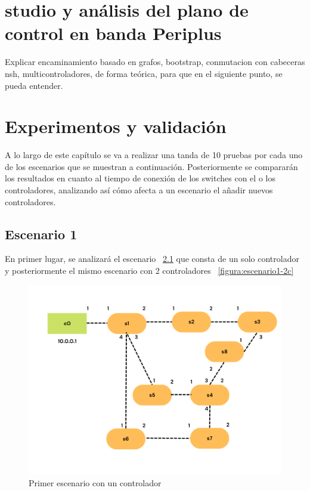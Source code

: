 \documentclass[a4paper, 12pt]{book}
\begin{document}
	\chapter{studio y análisis del plano de control en banda Periplus} %
	\label{chap:periplus} %
	Explicar encaminamiento basado en grafos, bootstrap, conmutacion con cabeceras nsh, multicontroladores, de forma teórica, para que en el siguiente punto, se pueda entender.
	
	
	\cleardoublepage
	\chapter{Experimentos y validación}
	\label{chap:experimentos}
	
 	A lo largo de este capítulo se va a realizar una tanda de 10 pruebas por cada uno de los escenarios que se muestran a continuación. Posteriormente se compararán los resultados en cuanto al tiempo de conexión de los switches con el o los controladores, analizando así cómo afecta a un escenario el añadir nuevos controladores.
 	
 	\section{Escenario 1}
 	En primer lugar, se analizará el escenario ~\ref{figura:escenario1-1c} que consta de un solo controlador y posteriormente el mismo escenario con 2 controladores ~\ref{figura:escenario1-2c}
 	
 	\begin{figure}[H]
 		\centering
 		\includegraphics[width=16cm, keepaspectratio]{img/escenario1-1}
 		\caption{Primer escenario con un controlador}
 		\label{figura:escenario1-1c}
 	\end{figure}
 	
\end{document}

